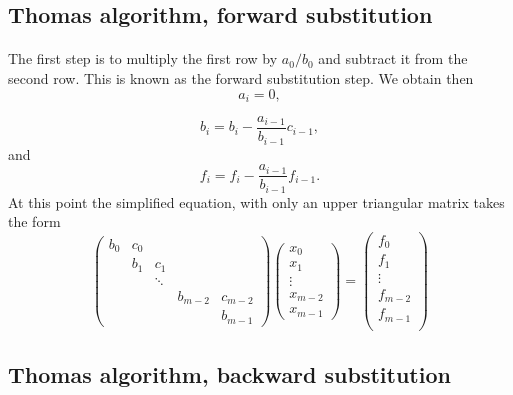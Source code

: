\documentclass[%
oneside,                 %
final,                   %
10pt]{article}
\begin{document}
\subsection*{Thomas algorithm, forward substitution}

\paragraph{}
The first step is to multiply the first row by $a_0/b_0$ and subtract it from the second row.  This is known as the forward substitution step. We obtain then
\[
	a_i = 0,
\]

\[                                 
	b_i = b_i - \frac{a_{i-1}}{b_{i-1}}c_{i-1},
\]
and
\[
	f_i = f_i - \frac{a_{i-1}}{b_{i-1}}f_{i-1}.
\]
At this point the simplified equation, with only an upper triangular matrix takes the form
\[
\left( \begin{array}{ccccc}
    b_0 & c_0 &        &         &         \\
       & b_1 &  c_1    &         &         \\
          &    & \ddots &         &         \\
	     &     &        & b_{m-2} & c_{m-2} \\
	        &    &        &         & b_{m-1}
   \end{array} \right)\left( \begin{array}{c}
       x_0     \\
       x_1     \\
       \vdots  \\
       x_{m-2} \\
       x_{m-1}
   \end{array} \right)=\left( \begin{array}{c}
       f_0     \\
       f_1     \\
       \vdots  \\
       f_{m-2} \\
       f_{m-1} \\
   \end{array} \right)
\]



\subsection*{Thomas algorithm, backward substitution}
\end{document}
